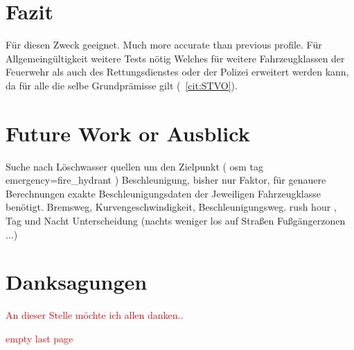 \documentclass[12pt,a4paper]{article}
\newcommand\todo[1]{\textcolor{red}{#1}}
\begin{document}
\newpage
\section{Fazit}

Für diesen Zweck geeignet.
Much more accurate than previous profile. 
Für Allgemeingültigkeit weitere Tests nötig
Welches für weitere Fahrzeugklassen der Feuerwehr als auch des Rettungsdienstes oder der Polizei erweitert werden kann, da für alle die selbe Grundprämisse gilt (~\ref{cit:STVO}).

\newpage
\section{Future Work or Ausblick}

Suche nach Löschwasser quellen um den Zielpunkt ( osm tag emergency=fire\_hydrant )
Beschleunigung, bisher nur Faktor, für genauere Berechnungen exakte Beschleunigungsdaten der Jeweiligen Fahrzeugklasse benötigt. Bremsweg, Kurvengeschwindigkeit, Beschleunigungsweg.
rush hour , Tag und Nacht Unterscheidung (nachts weniger los auf Straßen\/ Fußgängerzonen ...)

\printbibliography

\newpage
\section*{Danksagungen}
\todo{An dieser Stelle möchte ich allen danken.. }

\newpage
\todo{empty last page}
\end{document}
